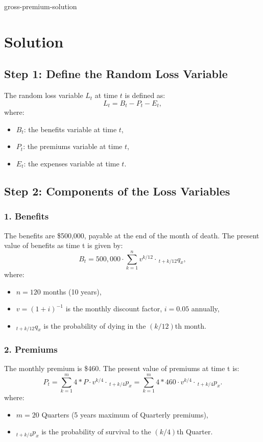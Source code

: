 	\begin{solve}{}{gross-premium-solution}
		\section*{Solution}
		
		\subsection*{Step 1: Define the Random Loss Variable}
		The random loss variable $L_t$ at time $t$ is defined as:
		\[
		L_t = B_t - P_t - E_t,
		\]
		where:
		\begin{itemize}
			\item $B_t$: the benefits variable at time $t$,
			\item $P_t$: the premiums variable  at time $t$,
			\item $E_t$: the expenses variable at time $t$.
		\end{itemize}
		
		\subsection*{Step 2: Components of the Loss Variables}
		\subsubsection*{1. Benefits}
		The benefits are \$500,000, payable at the end of the month of death. The present value of benefits as time t is given by:
		\[
		B_t = 500,000 \cdot \sum_{k=1}^{n} v^{k/12} \cdot \,_{t+k/12}q_{x},
		\]
		where:
		\begin{itemize}
			\item $n = 120$ months (10 years),
			\item $v = (1+i)^{-1}$ is the monthly discount factor, $i = 0.05$ annually,
			\item $_{t+k/12}q_{x}$ is the probability of dying in the $(k/12)$th month.
		\end{itemize}
		
		\subsubsection*{2. Premiums}
		The monthly premium is \$460. The present value of premiums at time t is:
		\[
		P_t = \sum_{k=1}^{m} 4 * P \cdot v^{k/4} \cdot \,_{t+k/4}p_{x} = \sum_{k=1}^{m} 4 * 460 \cdot v^{k/4} \cdot \,_{t+k/4}p_{x}.
		\]
		where:
		\begin{itemize}
			\item $m = 20$ Quarters (5 years maximum of Quarterly premiums),
			\item $_{t+k/4}p_{x}$ is the probability of survival to the $(k/4)$th Quarter.
		\end{itemize}
		

\end{solve}
